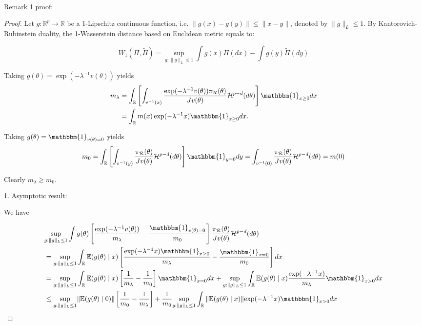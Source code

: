 \documentclass[10pt]{article}
\newcommand{\mc}[1]{\mathcal{#1}}
\DeclareMathOperator{\1}{\mathbbm{1}}
\begin{document}
Remark 1 proof:
\begin{proof}[Proof]
Let $g:\mathbb{R}^p\rightarrow \mathbb{R}$ be a 1-Lipschitz continuous function, i.e. $\|g(x)-g(y)\|\le \|x-y\|$, denoted by $\|g\|_L\le 1$. 
By Kantorovich-Rubinstein duality, the 1-Wasserstein distance based on Euclidean metric equals to: 

\begin{equation}
W_1(\Pi,\tilde\Pi)=\underset{g:\|g\|_L\le 1}\sup \int g(x) \Pi(dx) -  \int g(y) \tilde\Pi(dy) 
\end{equation}

Taking $g(\theta)=\exp(-\lambda^{-1}v(\theta))$ yields
\begin{equation}
\begin{aligned}
m_\lambda
& = \int_\mathbb{R}  \left[ \int_{v^{-1}(x)} \frac{ \exp(- \lambda^{-1} v(\theta) ) \pi_{\mc R}(\theta)}{ J v(\theta) } \mathcal{H}^{p-d}(d \theta) \right] \mathbbm{1}_{x \ge 0}  d x \\
& = \int_\mathbb{R}  m(x)\exp(- \lambda^{-1} x ) \mathbbm{1}_{x \ge 0}  d x .
\end{aligned}
\end{equation}

Taking $g(\theta)={\mathbbm{1}_{v(\theta)=0}}$ yields 
\begin{equation}
m_0
= \int_\mathbb{R} \left[ \int_{v^{-1}(y)} \frac{ \pi_{\mc R}(\theta) }{ J v(\theta) } \mathcal{H}^{p-d}(d \theta) \right]\mathbbm{1}_{y=0} dy   =  \int_{v^{-1}(0)} \frac{ \pi_{\mc R}(\theta) }{ J v(\theta) } \mathcal{H}^{p-d}(d \theta) =m(0)
\end{equation}

Clearly $m_\lambda \ge m_0$.

1. Asymptotic result:

We have

\begin{equation}		
\label{wass0}
\begin{aligned}
&\underset{g:\|g\|_L\le 1}\sup\int g(\theta)  \left[ \frac{ \exp(- \lambda^{-1} v(\theta)) } {  m_\lambda}  - 
\frac{ \mathbbm{1}_{v(\theta)=0} } {  m_0} 
\right]  \frac{\pi_{\mc R}(\theta)}{Jv(\theta)} \mc H^{p-d}(d \theta) \\
&= \underset{g:\|g\|_L\le 1}\sup\int_\mathbb{R}  \mathbb{E}(g(\theta) \mid x)  \left[ \frac{ \exp(- \lambda^{-1} x) \mathbbm{1}_{x \ge 0}} {  m_\lambda}  - 
\frac{ \mathbbm{1}_{x=0} } {  m_0} 
\right] d x \\
&=	\underset{g:\|g\|_L\le 1}\sup\int_\mathbb{R}  \mathbb{E}(g(\theta) \mid x)  \left[ \frac{  1} {  m_\lambda}  - 
\frac{ 1 } {  m_0} 
\right]\mathbbm{1}_{x=0} d x  + \underset{g:\|g\|_L\le 1}\sup\int_\mathbb{R}  \mathbb{E}(g(\theta) \mid x)\frac{ \exp(- \lambda^{-1} x)} {  m_\lambda}  
\mathbbm{1}_{x > 0} d x \\
& \le \underset{g:\|g\|_L\le 1}\sup \|\mathbb{E}(g(\theta) \mid 0)\| \left[ \frac{ 1 } {  m_0} -\frac{  1} {  m_\lambda}   
\right] + \frac{1} {  m_0} \underset{g:\|g\|_L\le 1}\sup \int_\mathbb{R}  \|\mathbb{E}(g(\theta) \mid x)\| { \exp(- \lambda^{-1} x)}
\mathbbm{1}_{x > 0} d x \\	
\end{aligned}
\end{equation}



\end{proof}
\end{document}
